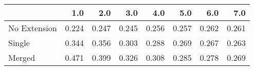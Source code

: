 \begin{tabular}{lrrrrrrr}
\toprule
{} &   1.0 &   2.0 &   3.0 &   4.0 &   5.0 &   6.0 &   7.0 \\
\midrule
No Extension & 0.224 & 0.247 & 0.245 & 0.256 & 0.257 & 0.262 & 0.261 \\
Single       & 0.344 & 0.356 & 0.303 & 0.288 & 0.269 & 0.267 & 0.263 \\
Merged       & 0.471 & 0.399 & 0.326 & 0.308 & 0.285 & 0.278 & 0.269 \\
\bottomrule
\end{tabular}

